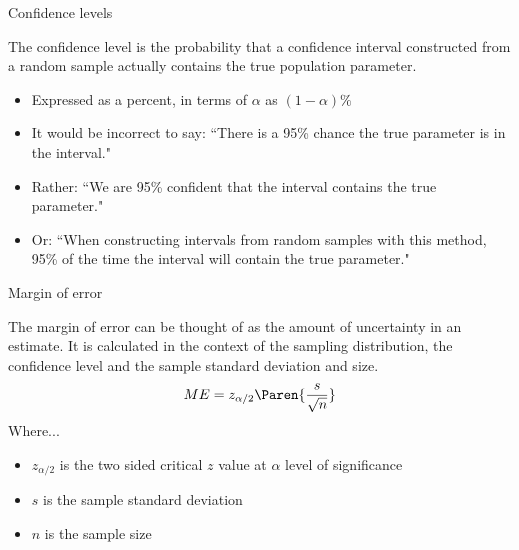 \documentclass[xcolor=table, handout]{beamer}
\begin{document}
\begin{frame}{Confidence levels}

\begin{block}{}
\large
The confidence level is the probability that a confidence interval constructed from a random sample actually contains the true population parameter.\\
\begin{itemize}
\pause\item Expressed as a percent, in terms of $\alpha$ as $(1-\alpha)\%$
\pause\item It would be incorrect to say: ``There is a 95\% chance the true parameter is in the interval."
\pause\item Rather: ``We are 95\% confident that the interval contains the true parameter."
\item Or: ``When constructing intervals from random samples with this method, 95\% of the time the interval will contain the true parameter."
\end{itemize} 
\end{block}

\end{frame}

\begin{frame}{Margin of error}
\begin{block}{}
\large
The margin of error can be thought of as the amount of uncertainty in an estimate. It is calculated in the context of the sampling distribution, the confidence level and the sample standard deviation and size.
\pause\[ME = z_{\alpha/2} \Paren{\frac s {\sqrt n}}\]
Where...
\begin{itemize}
\item $z_{\alpha/2}$ is the two sided critical $z$ value at $\alpha$ level of significance  
\item $s$ is the sample standard deviation
\item $n$ is the sample size
\end{itemize}
\end{block}
\end{frame}
\end{document}
